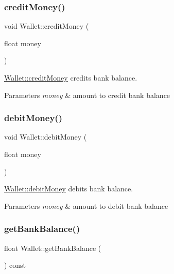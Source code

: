\subsubsection{\texorpdfstring{credit\+Money()}{creditMoney()}}
{\footnotesize\ttfamily void Wallet\+::credit\+Money (\begin{DoxyParamCaption}\item[{float}]{money }\end{DoxyParamCaption})}



\hyperlink{classWallet_ab9354b0a8250c0f21b867cc725a33e1e}{Wallet\+::credit\+Money} credits bank balance. 


\begin{DoxyParams}{Parameters}
{\em money} & amount to credit bank balance \\
\hline
\end{DoxyParams}
\mbox{\label{classWallet_a8be722d227a610e4b36b79c2eb04c73f}} 
\subsubsection{\texorpdfstring{debit\+Money()}{debitMoney()}}
{\footnotesize\ttfamily void Wallet\+::debit\+Money (\begin{DoxyParamCaption}\item[{float}]{money }\end{DoxyParamCaption})}



\hyperlink{classWallet_a8be722d227a610e4b36b79c2eb04c73f}{Wallet\+::debit\+Money} debits bank balance. 


\begin{DoxyParams}{Parameters}
{\em money} & amount to debit bank balance \\
\hline
\end{DoxyParams}
\mbox{\label{classWallet_a92536035a1de76dc7842693beb93cd24}} 
\subsubsection{\texorpdfstring{get\+Bank\+Balance()}{getBankBalance()}}
{\footnotesize\ttfamily float Wallet\+::get\+Bank\+Balance (\begin{DoxyParamCaption}{ }\end{DoxyParamCaption}) const}



